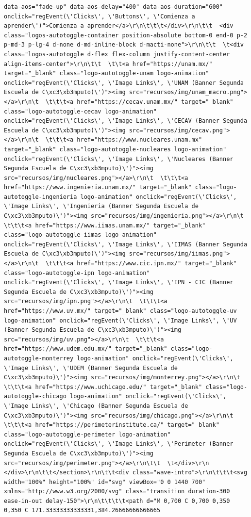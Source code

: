 \documentclass[
  spanish,
  letterpaper,
]{scrbook}
\theoremstyle{definition}
\theoremstyle{remark}
\begin{document}
\begin{verbatim}
data-aos="fade-up" data-aos-delay="400" data-aos-duration="600" onclick="regEvent(\'Clicks\', \'Buttons\', \'Comienza a aprender\')">Comienza a aprender</a>\r\n\t\t\t</div>\r\n\t\t  <div class="logos-autotoggle-container position-absolute bottom-0 end-0 p-2 p-md-3 p-lg-4 d-none d-md-inline-block d-macti-none">\r\n\t\t  \t<div class="logos-autotoggle d-flex flex-column justify-content-center align-items-center">\r\n\t\t  \t\t<a href="https://unam.mx/" target="_blank" class="logo-autotoggle-unam logo-animation" onclick="regEvent(\'Clicks\', \'Image Links\', \'UNAM (Banner Segunda Escuela de C\xc3\xb3mputo)\')"><img src="recursos/img/unam_macro.png"></a>\r\n\t  \t\t\t<a href="https://cecav.unam.mx/" target="_blank" class="logo-autotoggle-cecav logo-animation" onclick="regEvent(\'Clicks\', \'Image Links\', \'CECAV (Banner Segunda Escuela de C\xc3\xb3mputo)\')"><img src="recursos/img/cecav.png"></a>\r\n\t  \t\t\t<a href="https://www.nucleares.unam.mx" target="_blank" class="logo-autotoggle-nucleares logo-animation" onclick="regEvent(\'Clicks\', \'Image Links\', \'Nucleares (Banner Segunda Escuela de C\xc3\xb3mputo)\')"><img src="recursos/img/nucleares.png"></a>\r\n\t  \t\t\t<a href="https://www.ingenieria.unam.mx/" target="_blank" class="logo-autotoggle-ingenieria logo-animation" onclick="regEvent(\'Clicks\', \'Image Links\', \'Ingenieria (Banner Segunda Escuela de C\xc3\xb3mputo)\')"><img src="recursos/img/ingenieria.png"></a>\r\n\t  \t\t\t<a href="https://www.iimas.unam.mx/" target="_blank" class="logo-autotoggle-iimas logo-animation" onclick="regEvent(\'Clicks\', \'Image Links\', \'IIMAS (Banner Segunda Escuela de C\xc3\xb3mputo)\')"><img src="recursos/img/iimas.png"></a>\r\n\t  \t\t\t<a href="https://www.cic.ipn.mx/" target="_blank" class="logo-autotoggle-ipn logo-animation" onclick="regEvent(\'Clicks\', \'Image Links\', \'IPN - CIC (Banner Segunda Escuela de C\xc3\xb3mputo)\')"><img src="recursos/img/ipn.png"></a>\r\n\t  \t\t\t<a href="https://www.uv.mx/" target="_blank" class="logo-autotoggle-uv logo-animation" onclick="regEvent(\'Clicks\', \'Image Links\', \'UV (Banner Segunda Escuela de C\xc3\xb3mputo)\')"><img src="recursos/img/uv.png"></a>\r\n\t  \t\t\t<a href="https://www.udem.edu.mx/" target="_blank" class="logo-autotoggle-monterrey logo-animation" onclick="regEvent(\'Clicks\', \'Image Links\', \'UDEM (Banner Segunda Escuela de C\xc3\xb3mputo)\')"><img src="recursos/img/monterrey.png"></a>\r\n\t  \t\t\t<a href="https://www.uchicago.edu/" target="_blank" class="logo-autotoggle-chicago logo-animation" onclick="regEvent(\'Clicks\', \'Image Links\', \'Chicago (Banner Segunda Escuela de C\xc3\xb3mputo)\')"><img src="recursos/img/chicago.png"></a>\r\n\t  \t\t\t<a href="https://perimeterinstitute.ca/" target="_blank" class="logo-autotoggle-perimeter logo-animation" onclick="regEvent(\'Clicks\', \'Image Links\', \'Perimeter (Banner Segunda Escuela de C\xc3\xb3mputo)\')"><img src="recursos/img/perimeter.png"></a>\r\n\t\t  \t</div>\r\n      </div>\r\n\t\t</section>\r\n\t\t<div class="wave-intro">\r\n\t\t\t<svg width="100%" height="100%" id="svg" viewBox="0 0 1440 700" xmlns="http://www.w3.org/2000/svg" class="transition duration-300 ease-in-out delay-150">\r\n\t\t\t\t<path d="M 0,700 C 0,700 0,350 0,350 C 171.33333333333331,384.26666666666665 
\end{verbatim}
\end{document}
